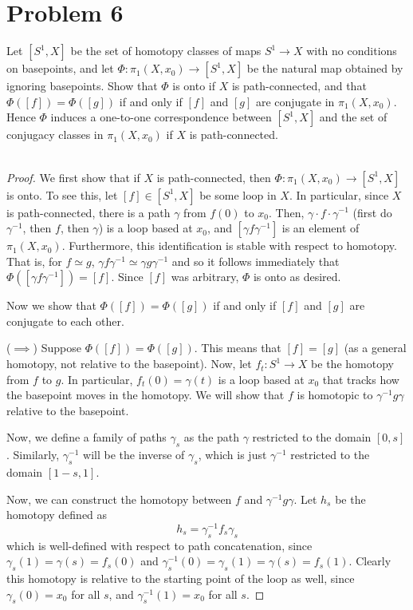 \documentclass[fontsize=11pt]{scrartcl} %
\numberwithin{equation}{section} %
\numberwithin{figure}{section} %
\numberwithin{table}{section} %
\begin{document}
\section*{Problem 6}
Let $[S^1,X]$ be the set of homotopy classes of maps $S^1\to X$ with no
conditions on basepoints, and let $\Phi:\pi_1(X,x_0)\to [S^1,X]$ be the natural
map obtained by ignoring basepoints. Show that $\Phi$ is onto if $X$ is
path-connected, and that $\Phi([f]) = \Phi([g])$ if and only if $[f]$ and $[g]$
are conjugate in $\pi_1(X,x_0)$. Hence $\Phi$ induces a one-to-one
correspondence between $[S^1,X]$ and the set of conjugacy classes in
$\pi_1(X,x_0)$ if $X$ is path-connected.
\\
\\
\begin{proof}
    We first show that if $X$ is path-connected, then $\Phi:\pi_1(X,x_0)\to
    [S^1,X]$ is onto. To see this, let $[f]\in [S^1,X]$ be some loop in $X$. In
    particular, since $X$ is path-connected, there is a path $\gamma$ from $f(0)$ to
    $x_0$. Then, $\gamma\cdot f\cdot \gamma^{-1}$ (first do $\gamma^{-1}$, then
    $f$, then $\gamma$) is a loop based at $x_0$, and $[\gamma f \gamma^{-1}]$
    is an element of $\pi_1(X,x_0)$. Furthermore, this identification is stable
    with respect to homotopy. That is, for $f\simeq g$, $\gamma f
    \gamma^{-1}\simeq \gamma g\gamma^{-1}$ and so it follows immediately that
    $\Phi([\gamma f \gamma^{-1}]) = [f]$. Since $[f]$ was arbitrary, $\Phi$ is
    onto as desired.

    Now we show that $\Phi([f]) = \Phi([g])$ if and only if $[f]$ and $[g]$ are
    conjugate to each other.

    ($\implies$)
    Suppose $\Phi([f]) = \Phi([g])$. This means that $[f] = [g]$ (as a general
    homotopy, not relative to the basepoint). Now, let $f_t:S^1\to X$ be the
    homotopy from $f$ to $g$. In particular, $f_t(0) = \gamma(t)$ is a loop
    based at $x_0$ that tracks how the basepoint moves in the homotopy. We will
    show that $f$ is homotopic to $\gamma^{-1} g \gamma$ relative to the
    basepoint. 

    Now, we define a family of paths $\gamma_s$ as the path $\gamma$ restricted
    to the domain $[0,s]$. Similarly, $\gamma_s^{-1}$ will be the inverse of
    $\gamma_s$, which is just $\gamma^{-1}$ restricted to the domain $[1-s,1]$.

    Now, we can construct the homotopy between $f$ and $\gamma^{-1}g\gamma$. 
    Let $h_s$ be the homotopy defined as
    \[
        h_s = \gamma^{-1}_s f_s\gamma_s
    \]
    which is well-defined with respect to path concatenation, since $\gamma_s(1)
    = \gamma(s) = f_s(0)$ and $\gamma^{-1}_s(0) = \gamma_s(1) = \gamma(s) =
    f_s(1)$. Clearly this homotopy is relative to the starting point of the loop
    as well, since $\gamma_s(0) = x_0$ for all $s$, and $\gamma^{-1}_s(1) = x_0$
    for all $s$.


\end{proof}
\end{document}
